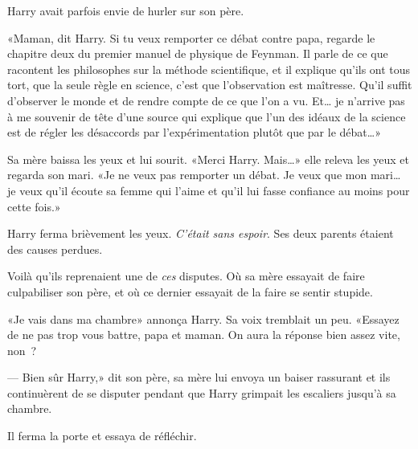Harry avait parfois envie de hurler sur son père.

«Maman, dit Harry. Si tu veux remporter ce débat contre papa, regarde le chapitre deux du premier manuel de physique de Feynman. Il parle de ce que racontent les philosophes sur la méthode scientifique, et il explique qu'ils ont tous tort, que la seule règle en science, c'est que l'observation est maîtresse. Qu'il suffit d'observer le monde et de rendre compte de ce que l'on a vu. Et… je n'arrive pas à me souvenir de tête d'une source qui explique que l'un des idéaux de la science est de régler les désaccords par l'expérimentation plutôt que par le débat…»

Sa mère baissa les yeux et lui sourit. «Merci Harry. Mais…» elle releva les yeux et regarda son mari. «Je ne veux pas remporter un débat. Je veux que mon mari… je veux qu'il écoute sa femme qui l'aime et qu'il lui fasse confiance au moins pour cette fois.»

Harry ferma brièvement les yeux. \emph{C'était sans espoir}. Ses deux parents étaient des causes perdues.

Voilà qu'ils reprenaient une de \emph{ces} disputes. Où sa mère essayait de faire culpabiliser son père, et où ce dernier essayait de la faire se
sentir stupide.

«Je vais dans ma chambre» annonça Harry. Sa voix tremblait un peu. «Essayez de ne pas trop vous battre, papa et maman. On aura la réponse bien assez vite, non~?

--- Bien sûr Harry,» dit son père, sa mère lui envoya un baiser rassurant et ils continuèrent de se disputer pendant que Harry grimpait les escaliers jusqu'à sa chambre.

Il ferma la porte et essaya de réfléchir.

